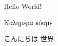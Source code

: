 \documentclass[12pt]{article}
\begin{document}
\begin{CJK}{UTF8}{song}

\noindent Hello World!

\noindent Καλημέρα κόσμε

\CJKnospace
\noindent こんにちは 世界

\end{CJK}
\end{document}
